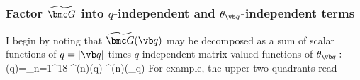 \documentclass[letterpaper]{article}
\renewcommand{\wt}{\widetilde}
\begin{document}
\subsubsection{Factor $\wt{\bmc G}$ into $q$-independent and $\theta_{\vb q}$-independent terms}
\label{wtGDecomposition}

I begin by noting that $\wt{\bmc G}(\vb q)$ may be decomposed as a sum
of scalar functions of $q=|\vb q|$ times $q$-independent
matrix-valued functions of $\theta_{\vb q}:$
{
  \wt{\bmc G}(\vb q)=\sum_{n=1}^{18}
  \wt{g}^{(n)}(q) \vbLambda^{(n)}(\theta_{\vb q})
}
For example, the upper two quadrants read
\end{document}
